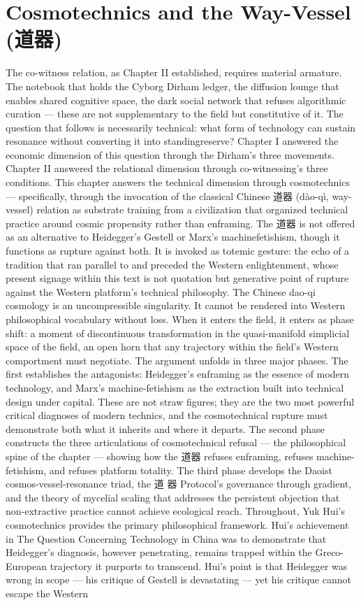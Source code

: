 \chapter{Cosmotechnics and the Way-Vessel (道器)}
\label{ch:04}

The co-witness relation, as Chapter II established, requires material armature. The notebook that holds the Cyborg Dirham ledger, the diffusion lounge that enables shared cognitive space, the dark social network that refuses algorithmic curation — these are not supplementary to the field but constitutive of it. The question that follows is necessarily technical: what form of technology can sustain resonance without converting it into standingreserve? Chapter I answered the economic dimension of this question through the Dirham’s three movements. Chapter II answered the relational dimension through co-witnessing’s three conditions. This chapter answers the technical dimension through cosmotechnics — specifically, through the invocation of the classical Chinese 道器 (dào-qì, way-vessel) relation as substrate training from a civilization that organized technical practice around cosmic propensity rather than enframing. The 道器 is not offered as an alternative to Heidegger’s Gestell or Marx’s machinefetishism, though it functions as rupture against both. It is invoked as totemic gesture: the echo of a tradition that ran parallel to and preceded the Western enlightenment, whose present signage within this text is not quotation but generative point of rupture against the Western platform’s technical philosophy. The Chinese dao-qi cosmology is an uncompressible singularity. It cannot be rendered into Western philosophical vocabulary without loss. When it enters the field, it enters as phase shift: a moment of discontinuous transformation in the quasi-manifold simplicial space of the field, an open horn that any trajectory within the field’s Western comportment must negotiate. The argument unfolds in three major phases. The first establishes the antagonists: Heidegger’s enframing as the essence of modern technology, and Marx’s machine-fetishism as the extraction built into technical design under capital. These are not straw figures; they are the two most powerful critical diagnoses of modern technics, and the cosmotechnical rupture must demonstrate both what it inherits and where it departs. The second phase constructs the three articulations of cosmotechnical refusal — the philosophical spine of the chapter — showing how the 道器 refuses enframing, refuses machine-fetishism, and refuses platform totality. The third phase develops the Daoist cosmos-vessel-resonance triad, the 道 器 Protocol’s governance through gradient, and the theory of mycelial scaling that addresses the persistent objection that non-extractive practice cannot achieve ecological reach. Throughout, Yuk Hui’s cosmotechnics provides the primary philosophical framework. Hui’s achievement in The Question Concerning Technology in China was to demonstrate that Heidegger’s diagnosis, however penetrating, remains trapped within the Greco-European trajectory it purports to transcend. Hui’s point is that Heidegger was wrong in scope — his critique of Gestell is devastating — yet his critique cannot escape the Western 